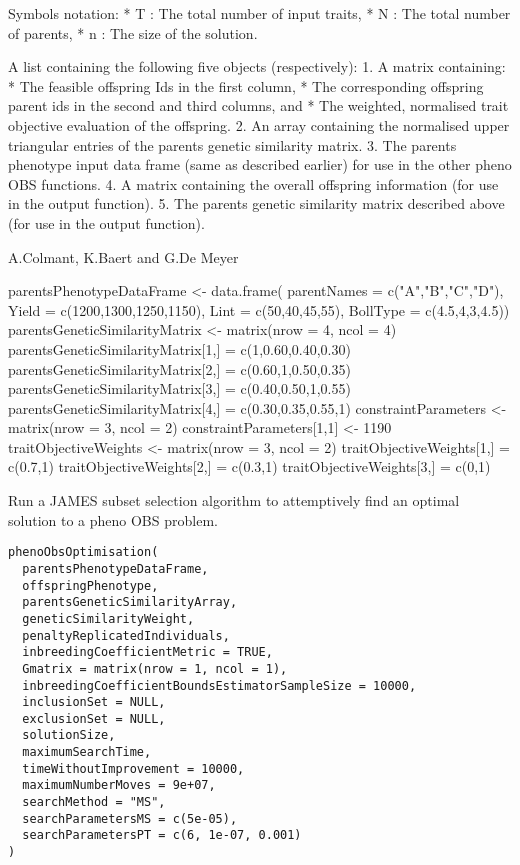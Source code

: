 \documentclass[a4paper]{book}
\begin{document}
%
\begin{Details}\relax
Symbols notation:
* T : The total number of input traits,
* N : The total number of parents,
* n : The size of the solution.
\end{Details}
%
\begin{Value}
A list containing the following five objects (respectively): 
1. A matrix containing:
* The feasible offspring Ids in the first column,
* The corresponding offspring parent ids in the second and third columns, and
* The weighted, normalised trait objective evaluation of the offspring.
2. An array containing the normalised upper triangular entries of the parents genetic similarity matrix.
3. The parents phenotype input data frame (same as described earlier) for use in the other pheno OBS functions. 
4. A matrix containing the overall offspring information (for use in the output function).
5. The parents genetic similarity matrix described above (for use in the output function).
\end{Value}
%
\begin{Author}\relax
A.Colmant, K.Baert and G.De Meyer
\end{Author}
%
\begin{Examples}
\begin{ExampleCode}
parentsPhenotypeDataFrame <- data.frame(
parentNames = c("A","B","C","D"),
Yield = c(1200,1300,1250,1150),
Lint = c(50,40,45,55),
BollType = c(4.5,4,3,4.5))
parentsGeneticSimilarityMatrix <- matrix(nrow = 4, ncol = 4)
parentsGeneticSimilarityMatrix[1,] = c(1,0.60,0.40,0.30)
parentsGeneticSimilarityMatrix[2,] = c(0.60,1,0.50,0.35)
parentsGeneticSimilarityMatrix[3,] = c(0.40,0.50,1,0.55)
parentsGeneticSimilarityMatrix[4,] = c(0.30,0.35,0.55,1)
constraintParameters <- matrix(nrow = 3, ncol = 2)
constraintParameters[1,1] <- 1190
traitObjectiveWeights <- matrix(nrow = 3, ncol = 2)
traitObjectiveWeights[1,] = c(0.7,1)
traitObjectiveWeights[2,] = c(0.3,1)
traitObjectiveWeights[3,] = c(0,1)

\end{ExampleCode}
\end{Examples}
%
\begin{Description}\relax
Run a JAMES subset selection algorithm to attemptively find an optimal solution to a pheno OBS problem.
\end{Description}
%
\begin{Usage}
\begin{verbatim}
phenoObsOptimisation(
  parentsPhenotypeDataFrame,
  offspringPhenotype,
  parentsGeneticSimilarityArray,
  geneticSimilarityWeight,
  penaltyReplicatedIndividuals,
  inbreedingCoefficientMetric = TRUE,
  Gmatrix = matrix(nrow = 1, ncol = 1),
  inbreedingCoefficientBoundsEstimatorSampleSize = 10000,
  inclusionSet = NULL,
  exclusionSet = NULL,
  solutionSize,
  maximumSearchTime,
  timeWithoutImprovement = 10000,
  maximumNumberMoves = 9e+07,
  searchMethod = "MS",
  searchParametersMS = c(5e-05),
  searchParametersPT = c(6, 1e-07, 0.001)
)
\end{verbatim}
\end{Usage}
\end{document}
